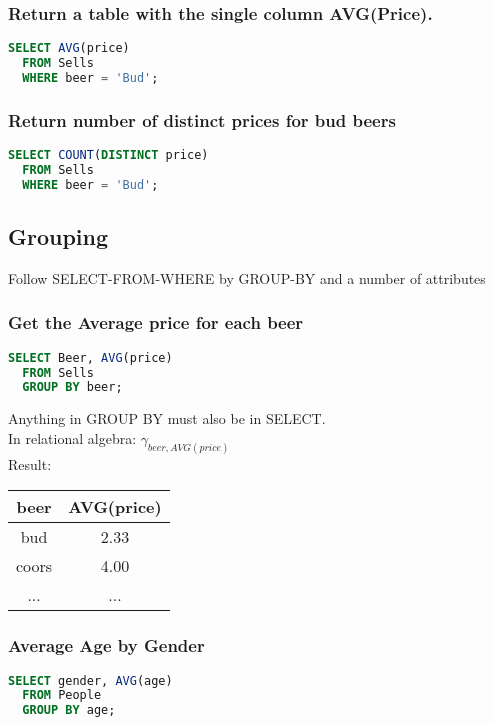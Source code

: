 \documentclass[12pt]{article}
\begin{document}
\subsubsection{Return a table with the single column AVG(Price).}
\begin{lstlisting}[language=SQL]
  SELECT AVG(price)
  FROM Sells
  WHERE beer = 'Bud';
\end{lstlisting}

\subsubsection{Return number of distinct prices for bud beers}
\begin{lstlisting}[language=SQL]
  SELECT COUNT(DISTINCT price)
  FROM Sells
  WHERE beer = 'Bud';
\end{lstlisting}

\subsection{Grouping}
Follow SELECT-FROM-WHERE by GROUP-BY and a number of attributes

\subsubsection{Get the Average price for each beer}
\begin{lstlisting}[language=SQL]
  SELECT Beer, AVG(price)
  FROM Sells
  GROUP BY beer;
\end{lstlisting}
Anything in GROUP BY must also be in SELECT.\\
In relational algebra: 
$\gamma_{beer,AVG(price)}$\\
Result: 
\begin{tabular}{|c|c|}
  \hline
  beer & AVG(price)\\ 
  \hline
  bud & 2.33\\ 
  coors & 4.00\\ 
  ... & ...\\
\end{tabular}

\subsubsection{Average Age by Gender}
\begin{lstlisting}[language=SQL]
  SELECT gender, AVG(age)
  FROM People
  GROUP BY age;
\end{lstlisting}
\end{document}
